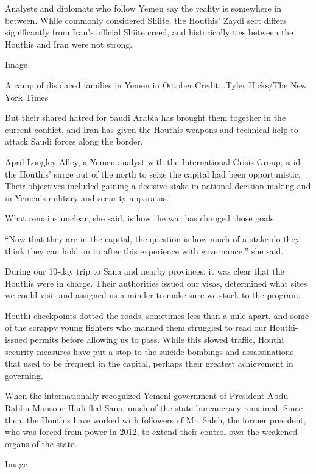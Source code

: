 Analysts and diplomats who follow Yemen say the reality is somewhere in
between. While commonly considered Shiite, the Houthis' Zaydi sect
differs significantly from Iran's official Shiite creed, and
historically ties between the Houthis and Iran were not strong.

Image

A camp of displaced families in Yemen in October.Credit...Tyler
Hicks/The New York Times

But their shared hatred for Saudi Arabia has brought them together in
the current conflict, and Iran has given the Houthis weapons and
technical help to attack Saudi forces along the border.

April Longley Alley, a Yemen analyst with the International Crisis
Group, said the Houthis' surge out of the north to seize the capital had
been opportunistic. Their objectives included gaining a decisive stake
in national decision-making and in Yemen's military and security
apparatus.

What remains unclear, she said, is how the war has changed those goals.

``Now that they are in the capital, the question is how much of a stake
do they think they can hold on to after this experience with
governance,'' she said.

During our 10-day trip to Sana and nearby provinces, it was clear that
the Houthis were in charge. Their authorities issued our visas,
determined what sites we could visit and assigned us a minder to make
sure we stuck to the program.

Houthi checkpoints dotted the roads, sometimes less than a mile apart,
and some of the scrappy young fighters who manned them struggled to read
our Houthi-issued permits before allowing us to pass. While this slowed
traffic, Houthi security measures have put a stop to the suicide
bombings and assassinations that used to be frequent in the capital,
perhaps their greatest achievement in governing.

When the internationally recognized Yemeni government of President Abdu
Rabbu Mansour Hadi fled Sana, much of the state bureaucracy remained.
Since then, the Houthis have worked with followers of Mr. Saleh, the
former president, who was
\href{http://www.nytimes3xbfgragh.onion/2012/02/22/world/middleeast/yemen-votes-to-remove-ali-abdullah-saleh.html}{forced
from power in 2012}, to extend their control over the weakened organs of
the state.

Image

